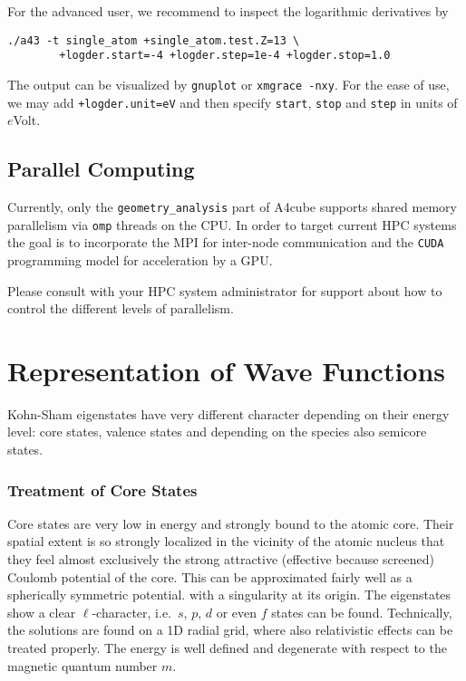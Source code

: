 \documentclass[oribibl]{llncs}
\newcommand{\ttt}[1]{\texttt{#1}}
\newcommand{\codename}{A4cube}
\begin{document}
For the advanced user, we recommend to inspect the logarithmic derivatives by
\begin{verbatim}
./a43 -t single_atom +single_atom.test.Z=13 \
        +logder.start=-4 +logder.step=1e-4 +logder.stop=1.0
\end{verbatim}
The output can be visualized by \ttt{gnuplot} or \ttt{xmgrace -nxy}.
For the ease of use, we may add \ttt{+logder.unit=eV} and then specify
\ttt{start}, \ttt{stop} and \ttt{step} in units of $e$Volt.


\subsection{Parallel Computing}
Currently, only the \ttt{geometry\_analysis} part of \codename{} supports shared memory parallelism 
via \ttt{omp} threads on the \ac{CPU}.
In order to target current \ac{HPC} systems 
the goal is to incorporate the \ac{MPI}
for inter-node communication
and the \ttt{CUDA} programming model for acceleration by a \ac{GPU}.
\todo[inline]{MPI parallelize}

Please consult with your \ac{HPC} system administrator for support
about how to control the different levels of parallelism.

\section{Representation of Wave Functions}

Kohn-Sham eigenstates have very different character depending on their energy level: core states, valence states and depending on the species also semicore states.
\subsubsection{Treatment of Core States}
Core states are very low in energy and strongly bound 
to the atomic core.
Their spatial extent is so strongly localized 
in the vicinity of the atomic nucleus 
that they feel almost exclusively the strong attractive 
(effective because screened) Coulomb potential of the core. 
This can be approximated fairly well as a spherically symmetric potential.
with a singularity at its origin.
The eigenstates show a clear $\ell$-character, 
i.e.~$s$, $p$, $d$ or even $f$ states can be found.
Technically, the solutions are found on a 1D radial grid,
where also relativistic effects can be treated properly.
The energy is well defined and degenerate with respect to
the magnetic quantum number $m$.
\end{document}
